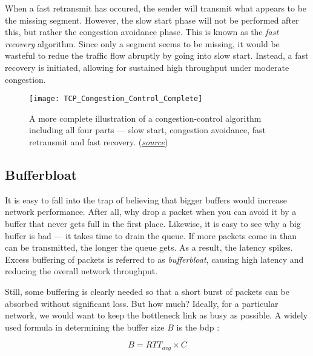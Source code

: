When a fast retransmit has occured, the sender will transmit what appears to be the missing segment. However, the slow start phase will not be performed after this, but rather the congestion avoidance phase. This is known as the \textit{fast recovery} algorithm. Since only a segment seems to be missing, it would be wasteful to redue the traffic flow abruptly by going into slow start. Instead, a fast recovery is initiated, allowing for sustained high throughput under moderate congestion.

\begin{figure}[H]
    \centering
    \texttt{[image: TCP\_Congestion\_Control\_Complete]}
    \captionsetup{width=0.6\textwidth}
    \caption{A more complete illustration of a congestion-control algorithm including all four parts --- slow start, congestion avoidance, fast retransmit and fast recovery. (\href{https://sites.google.com/site/projectcodebank/computer-engineering-notes/tcp-congestion-control-algorithm}{\textit{source}})}
\end{figure}






\subsection{Bufferbloat}

It is easy to fall into the trap of believing that bigger buffers would increase network performance. After all, why drop a packet when you can avoid it by a buffer that never gets full in the first place. Likewise, it is easy to see why a big buffer is bad --- it takes time to drain the queue. If more packets come in than can be transmitted, the longer the queue gets. As a result, the latency spikes. Excess buffering of packets is referred to as \textit{bufferbloat}, causing high latency and reducing the overall network throughput.

Still, some buffering is clearly needed so that a short burst of packets can be absorbed without significant loss. But how much? Ideally, for a particular network, we would want to keep the bottleneck link as busy as possible. A widely used formula in determining the buffer size $B$ is the \gls{bdp} \cite{sizing_router_buffers}:

\begin{equation}
    B = RTT_{avg} \times C
\end{equation}

